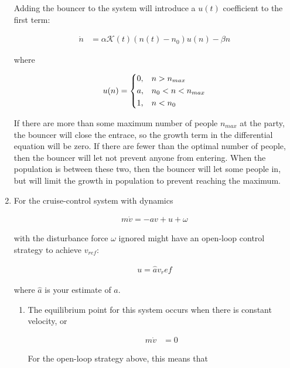 \documentclass[11pt]{article}
\theoremstyle{definition}
\begin{document}
\begin{enumerate}
    Adding the bouncer to the system will introduce a $u(t)$ coefficient to the first term:

    \begin{align*}
        \dot{n} &= \alpha \mathcal{K}(t) (n(t) - n_0)u(n) - \beta{n}
    \end{align*}    

    where

    \[
        u(n) = 
        \begin{dcases}
        0, & n > n_{max} \\
        a, & n_0 < n < n_{max} \\
        1, & n < n_0
        \end{dcases}
    \]

    If there are more than some maximum number of people $n_{max}$ at the party, the bouncer will close the entrace, so the growth term in the differential equation will be zero.  If there are fewer than the optimal number of people, then the bouncer will let not prevent anyone from entering.  When the population is between these two, then the bouncer will let some people in, but will limit the growth in population to prevent reaching the maximum.

    \item %
    
    For the cruise-control system with dynamics
    
    \begin{align*}
        m\dot{v} = -av + u + \omega
    \end{align*}
    
    with the disturbance force $\omega$ ignored might have an open-loop control strategy to achieve $v_{ref}$:
    
    \begin{align*}
        u = \hat{a}v_ref
    \end{align*}
    
    where $\hat{a}$ is your estimate of $a$.
    
    \begin{enumerate}
        \item %
        The equilibrium point for this system occurs when there is constant velocity, or
        
        \begin{align*}
            m\dot{v} &= 0
        \end{align*}
        
        For the open-loop strategy above, this means that
        

\end{enumerate}
\end{enumerate}
\end{document}
